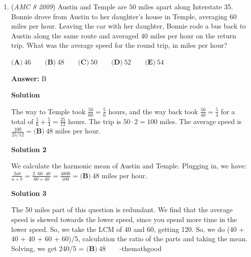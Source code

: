 \begin{enumerate}
The three digit numbers are $135,153,351,315,513,531$. The numbers that end in $5$ are divisible are $5$, and the probability of choosing those numbers is $\boxed{\textbf{(B)}\ \frac13}$.

 



\textbf{Solution 2}

The number is divisible by 5 if and only if the number ends in $5$ (also $0$, but that case can be ignored, as none of the digits are $0$)If we randomly arrange the three digits, the probability of the last digit being $5$ is $\boxed{\textbf{(B)}\ \frac13}$.

 Note: The last sentence is true because there are $3$ randomly-arrangeable numbers)

 


	\item (\textit{AMC 8 2009}) Austin and Temple are $50$ miles apart along Interstate 35. Bonnie drove from Austin to her daughter's house in Temple, averaging $60$ miles per hour. Leaving the car with her daughter, Bonnie rode a bus back to Austin along the same route and averaged $40$ miles per hour on the return trip. What was the average speed for the round trip, in miles per hour?  


 $\textbf{(A)}\ 46\qquad\textbf{(B)}\ 48\qquad\textbf{(C)}\ 50\qquad\textbf{(D)}\ 52\qquad\textbf{(E)}\ 54$

 \textbf{Answer: }B



\textbf{Solution}

The way to Temple took $\frac{50}{60}=\frac56$ hours, and the way back took $\frac{50}{40}=\frac54$ for a total of $\frac56 + \frac54 = \frac{25}{12}$ hours. The trip is $50\cdot2=100$ miles. The average speed is $\frac{100}{25/12} = \boxed{\textbf{(B)}\ 48}$ miles per hour.

 



\textbf{Solution 2}

We calculate the harmonic mean of Austin and Temple. Plugging in, we have: $\frac{2ab}{a+b} = \frac{2 \cdot 60 \cdot 40}{60 + 40} = \frac{4800}{100} = \boxed{\textbf{(B)}\ 48}$ miles per hour.

 



\textbf{Solution 3}

The 50 miles part of this question is redundant. We find that the average speed is skewed towards the lower speed, since you spend more time in the lower speed. So, we take the LCM of 40 and 60, getting 120. So, we do (40 + 40 + 40 + 60 + 60)/5, calculation the ratio of the parts and taking the mean. Solving, we get 240/5  = $\boxed{\textbf{(B)}\   48 } \qquad$-themathgood


\end{enumerate}
